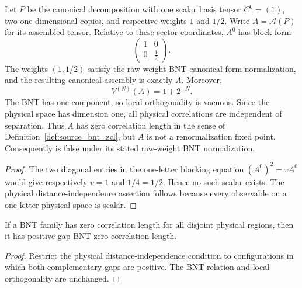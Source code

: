\begin{theorem}%
    \label{thm:halved_weight_zcl_not_rfp}
    \leanok
    Let $P$ be the canonical decomposition with one scalar basis tensor $C^0=(1)$,
    two one-dimensional copies, and respective weights $1$ and $1/2$. Write
    $A=\mathcal A(P)$ for its assembled tensor. Relative to these sector
    coordinates, $A^0$ has block form
    \[
        \begin{pmatrix}1&0\\0&\tfrac12\end{pmatrix}.
    \]
    The weights $(1,1/2)$ satisfy the raw-weight BNT canonical-form
    normalization, and the resulting canonical assembly is exactly $A$.
    Moreover,
    \[
        V^{(N)}(A)=1+2^{-N}.
    \]
    The BNT has one component, so local orthogonality is vacuous. Since the
    physical space has dimension one, all physical correlations are independent
    of separation. Thus $A$ has zero correlation length in the sense of
    Definition~\ref{def:source_bnt_zcl}, but $A$ is not a renormalization fixed
    point. Consequently \cite[Theorem~3.8]{Cirac2016MPDO_arXiv} is false under
    its stated raw-weight BNT normalization.
\end{theorem}
\begin{proof}\leanok
    The two diagonal entries in the one-letter blocking equation
    $(A^0)^2=vA^0$ would give respectively $v=1$ and $1/4=1/2$. Hence no such
    scalar exists. The physical distance-independence assertion follows because
    every observable on a one-letter physical space is scalar.
\end{proof}

\begin{lemma}%
    \label{lem:is_positive_gap_bnt_zcl_of_source_bnt_zcl}
    \leanok
    If a BNT family has zero correlation length for all disjoint physical
    regions, then it has positive-gap BNT zero correlation length.
\end{lemma}
\begin{proof}\leanok
    Restrict the physical distance-independence condition to configurations in
    which both complementary gaps are positive. The BNT relation and local
    orthogonality are unchanged.
\end{proof}

